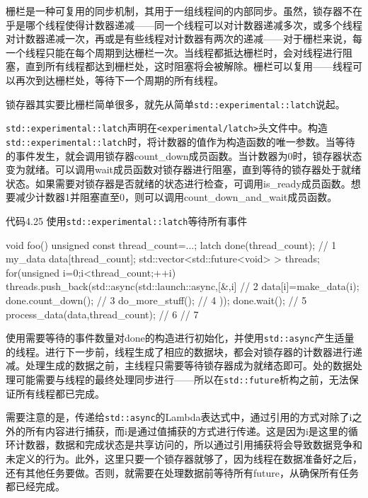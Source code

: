 栅栏是一种可复用的同步机制，其用于一组线程间的内部同步。虽然，锁存器不在乎是哪个线程使得计数器递减——同一个线程可以对计数器递减多次，或多个线程对计数器递减一次，再或是有些线程对计数器有两次的递减——对于栅栏来说，每一个线程只能在每个周期到达栅栏一次。当线程都抵达栅栏时，会对线程进行阻塞，直到所有线程都达到栅栏处，这时阻塞将会被解除。栅栏可以复用——线程可以再次到达栅栏处，等待下一个周期的所有线程。

锁存器其实要比栅栏简单很多，就先从简单\texttt{std::experimental::latch}说起。


\texttt{std::experimental::latch}声明在\texttt{<experimental/latch>}头文件中。构造\texttt{std::experimental::latch}时，将计数器的值作为构造函数的唯一参数。当等待的事件发生，就会调用锁存器count\_down成员函数。当计数器为0时，锁存器状态变为就绪。可以调用wait成员函数对锁存器进行阻塞，直到等待的锁存器处于就绪状态。如果需要对锁存器是否就绪的状态进行检查，可调用is\_ready成员函数。想要减少计数器1并阻塞直至0，则可以调用count\_down\_and\_wait成员函数。

代码4.25 使用\texttt{std::experimental::latch}等待所有事件

\begin{cpp}
void foo(){
  unsigned const thread_count=...;
  latch done(thread_count); // 1
  my_data data[thread_count];
  std::vector<std::future<void> > threads;
  for(unsigned i=0;i<thread_count;++i)
    threads.push_back(std::async(std::launch::async,[&,i]{ // 2
      data[i]=make_data(i);
      done.count_down(); // 3
      do_more_stuff(); // 4
    }));
  done.wait(); // 5
  process_data(data,thread_count); // 6
} // 7
\end{cpp}

使用需要等待的事件数量对done的构造进行初始化，并使用\texttt{std::async}产生适量的线程。进行下一步前，线程生成了相应的数据块，都会对锁存器的计数器进行递减。处理生成的数据之前，主线程只需要等待锁存器成为就绪态即可。处的数据处理可能需要与线程的最终处理同步进行——所以在\texttt{std::future}析构之前，无法保证所有线程都已完成。

需要注意的是，传递给\texttt{std::async}的Lambda表达式中，通过引用的方式对除了i之外的所有内容进行捕获，而i是通过值捕获的方式进行传递。这是因为i是这里的循环计数器，数据和完成状态是共享访问的，所以通过引用捕获将会导致数据竞争和未定义的行为。此外，这里只要一个锁存器就够了，因为线程在数据准备好之后，还有其他任务要做。否则，就需要在处理数据前等待所有future，从确保所有任务都已经完成。

